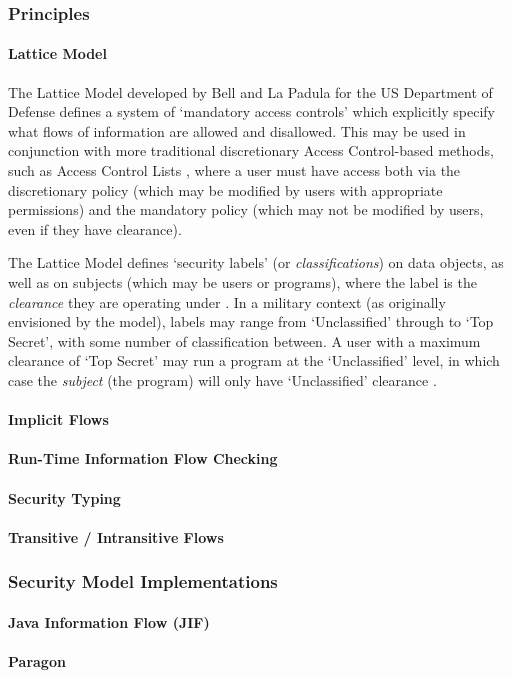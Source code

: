 \subsubsection{Principles}

	\paragraph{Lattice Model}
	
	The Lattice Model developed by Bell and La Padula for the US Department of Defense \cite{bell1976lattice} defines a system of `mandatory access controls' which explicitly specify what flows of information are allowed and disallowed. This may be used in conjunction with more traditional discretionary Access Control-based methods, such as Access Control Lists \cite{sandhu1993lattice}, where a user must have access both via the discretionary policy (which may be modified by users with appropriate permissions) and the mandatory policy (which may not be modified by users, even if they have clearance).
	
	The Lattice Model defines `security labels' (or \textit{classifications}) on data objects, as well as on subjects (which may be users or programs), where the label is the \textit{clearance} they are operating under \cite{denning1976lattice}. In a military context (as originally envisioned by the model), labels may range from `Unclassified' through to `Top Secret', with some number of classification between. A user with a maximum clearance of `Top Secret' may run a program at the `Unclassified' level, in which case the \textit{subject} (the program) will only have `Unclassified' clearance \cite{sandhu1993lattice}.
	
	
	
	\cite{denning1976lattice}
	
	\cite{sandhu1994access}
	
	\paragraph{Implicit Flows}
	
	\paragraph{Run-Time Information Flow Checking}

	\paragraph{Security Typing}
	
	\paragraph{Transitive / Intransitive Flows}

\subsubsection{Security Model Implementations}

	\paragraph{Java Information Flow (JIF)}
	
	\paragraph{Paragon}